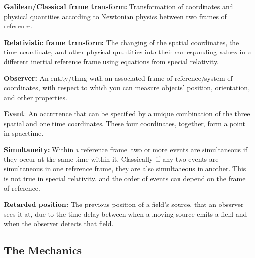 \linesep

\noindent \hypertarget{def-galilean-transform}{\textbf{Galilean/Classical frame transform:}}
Transformation of coordinates and physical quantities according to Newtonian physics between two frames of reference.

\linesep

\noindent \hypertarget{def-lorentz-transform}{\textbf{Relativistic frame transform:}}
The changing of the spatial coordinates, the time coordinate, and other physical quantities into their corresponding values in a different inertial reference frame using equations from special relativity.

\linesep

\noindent \hypertarget{def-observer}{\textbf{Observer:}}
An entity/thing with an associated frame of reference/system of coordinates, with respect to which you can measure objects' position, orientation, and other properties.

\linesep

\noindent \hypertarget{def-event}{\textbf{Event:}}
An occurrence that can be specified by a unique combination of the three spatial and one time coordinates. These four coordinates, together, form a point in spacetime.

\linesep

\noindent \hypertarget{def-simultaneity}{\textbf{Simultaneity:}}
Within a reference frame, two or more events are simultaneous if they occur at the same time within it. Classically, if any two events are simultaneous in one reference frame, they are also simultaneous in another. This is not true in special relativity, and the order of events can depend on the frame of reference.

\linesep

\noindent \hypertarget{def-retarded-position}{\textbf{Retarded position:}}
The previous position of a field's source, that an observer sees it at, due to the time delay between when a moving source emits a field and when the observer detects that field.

\linesep

\subsection{The Mechanics}%

